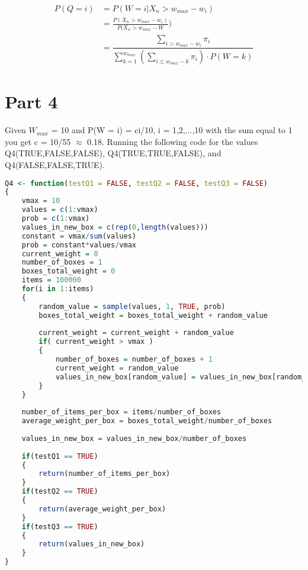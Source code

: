 \documentclass[10pt,a4paper]{article}
\begin{document}
\begin{align*}
P(Q=i) &= P(W=i | X_n > w_{max} - w_i) \\
&= \frac{P(X_n > w_{max} -w_i)}{P(X_n > w_{max} - W}) \\
&= \dfrac{\sum\limits_{i > w_{max} -w_i} \pi_i }{\sum\limits_{k=1}^{w_{max}} \left(\sum\limits_{i \leq w_{max} -k} \pi_i \right) \cdot P(W=k)}
\end{align*}

\section{Part 4}
Given $W_{max}$ = 10 and P(W = i) = ci/10, i = 1,2,...,10 with the sum equal to 1 you get c = 10/55 $\approx$ 0.18. Running the following code for the values Q4(TRUE,FALSE,FALSE), Q4(TRUE,TRUE,FALSE), and Q4(FALSE,FALSE,TRUE).
 
\begin{lstlisting}[language = R]
Q4 <- function(testQ1 = FALSE, testQ2 = FALSE, testQ3 = FALSE)
{
    vmax = 10
    values = c(1:vmax)
    prob = c(1:vmax)
    values_in_new_box = c(rep(0,length(values)))
    constant = vmax/sum(values)
    prob = constant*values/vmax
    current_weight = 0
    number_of_boxes = 1
    boxes_total_weight = 0
    items = 100000
    for(i in 1:items)
    {
        random_value = sample(values, 1, TRUE, prob)
        boxes_total_weight = boxes_total_weight + random_value
       
        current_weight = current_weight + random_value
        if( current_weight > vmax )
        {
            number_of_boxes = number_of_boxes + 1
            current_weight = random_value
            values_in_new_box[random_value] = values_in_new_box[random_value] + 1
        }
    }
   
    number_of_items_per_box = items/number_of_boxes
    average_weight_per_box = boxes_total_weight/number_of_boxes
   
    values_in_new_box = values_in_new_box/number_of_boxes
   
    if(testQ1 == TRUE)
    {
        return(number_of_items_per_box)
    }
    if(testQ2 == TRUE)
    {
        return(average_weight_per_box)
    }
    if(testQ3 == TRUE)
    {
        return(values_in_new_box)
    }
}
 
\end{lstlisting}
 
\end{document}

